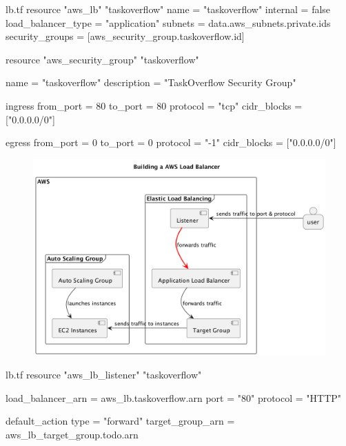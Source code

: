 \documentclass{csse4400}
\begin{document}
\begin{code}[language=terraform,numbers=none]{lb.tf}
resource "aws_lb" "taskoverflow" {
  name               = "taskoverflow"
  internal           = false
  load_balancer_type = "application"
  subnets            = data.aws_subnets.private.ids
  security_groups    = [aws_security_group.taskoverflow.id]
}

resource "aws_security_group" "taskoverflow" {
  name = "taskoverflow"
  description = "TaskOverflow Security Group"

  ingress {
    from_port = 80
    to_port = 80
    protocol = "tcp"
    cidr_blocks = ["0.0.0.0/0"]
  }

  egress {
    from_port = 0
    to_port = 0
    protocol = "-1"
    cidr_blocks = ["0.0.0.0/0"]
  }
}
\end{code}


\begin{figure}[H]
  \includegraphics[width=\textwidth]{diagrams/lb4}
\end{figure}

\begin{code}[language=terraform,numbers=none]{lb.tf}
resource "aws_lb_listener" "taskoverflow" {
  load_balancer_arn = aws_lb.taskoverflow.arn
  port              = "80"
  protocol          = "HTTP"

  default_action {
    type             = "forward"
    target_group_arn = aws_lb_target_group.todo.arn
  }
}
\end{code}

\end{document}
